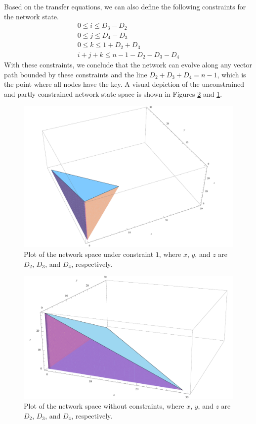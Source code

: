 \documentclass[a4paper,10pt]{article}
\begin{document}
Based on the transfer equations, we can also define the following constraints for the network state.
\begin{align}
0 \leq i \leq D_3 - D_2 \\
0 \leq j \leq D_4 - D_3 \\
0 \leq k \leq 1 + D_2 + D_3 \\
i + j + k \leq n - 1 - D_2 - D_3 - D_4
\end{align}
With these constraints, we conclude that the network can evolve along any vector path bounded by these
constraints and the line $D_2 + D_3 + D_4 = n - 1$, which is the point where all nodes have the key. A visual 
depiction of the unconstrained and partly constrained network state space is shown in Figures \ref{fig:unconstrained} 
and \ref{fig:constrained}.

\begin{figure}[ht!]
\begin{center}
\includegraphics[width=5in]{constrained_plot.pdf}
\end{center}
\label{fig:constrained}
\caption{Plot of the network space under constraint $1$, where $x$, $y$, and $z$ are $D_2$, $D_3$, and $D_4$, respectively.}
\end{figure}

\begin{figure}[ht!]
\begin{center}
\includegraphics[width=5in]{unconstrained_plot.pdf}
\end{center}
\label{fig:unconstrained}
\caption{Plot of the network space without constraints, where $x$, $y$, and $z$ are $D_2$, $D_3$, and $D_4$, respectively.}
\end{figure}
\end{document}

